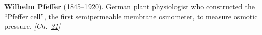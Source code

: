 \textbf{Wilhelm Pfeffer} (1845–1920). German plant physiologist who constructed the ``Pfeffer cell'', the first semipermeable membrane osmometer, to measure osmotic pressure. \emph{[Ch.~\hyperref[ch:osmosisdebye]{31}]}

